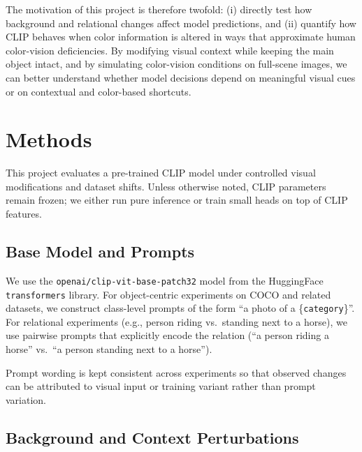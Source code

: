 \documentclass[11pt]{article}
\begin{document}
The motivation of this project is therefore twofold: (i) directly test how background and relational changes affect model predictions, and (ii) quantify how CLIP behaves when color information is altered in ways that approximate human color-vision deficiencies. By modifying visual context while keeping the main object intact, and by simulating color-vision conditions on full-scene images, we can better understand whether model decisions depend on meaningful visual cues or on contextual and color-based shortcuts.

\section{Methods}

This project evaluates a pre-trained CLIP model under controlled visual modifications and dataset shifts. Unless otherwise noted, CLIP parameters remain frozen; we either run pure inference or train small heads on top of CLIP features.

\subsection{Base Model and Prompts}

We use the \texttt{openai/clip-vit-base-patch32} model from the HuggingFace \texttt{transformers} library. For object-centric experiments on COCO and related datasets, we construct class-level prompts of the form ``a photo of a \{\texttt{category}\}''. For relational experiments (e.g., person riding vs.\ standing next to a horse), we use pairwise prompts that explicitly encode the relation (``a person riding a horse'' vs.\ ``a person standing next to a horse'').

Prompt wording is kept consistent across experiments so that observed changes can be attributed to visual input or training variant rather than prompt variation.

\subsection{Background and Context Perturbations}
\end{document}
